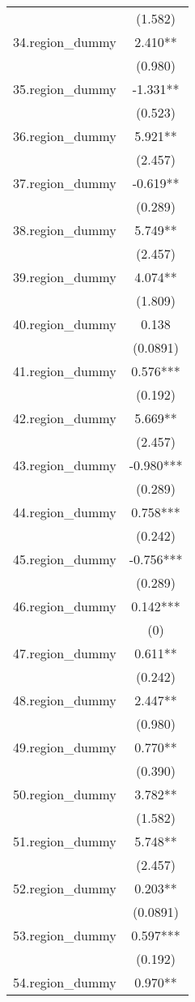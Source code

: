 \documentclass[]{article}
\begin{document}
\begin{tabular}{lc}
 & (1.582) \\
34.region\_dummy & 2.410** \\
 & (0.980) \\
35.region\_dummy & -1.331** \\
 & (0.523) \\
36.region\_dummy & 5.921** \\
 & (2.457) \\
37.region\_dummy & -0.619** \\
 & (0.289) \\
38.region\_dummy & 5.749** \\
 & (2.457) \\
39.region\_dummy & 4.074** \\
 & (1.809) \\
40.region\_dummy & 0.138 \\
 & (0.0891) \\
41.region\_dummy & 0.576*** \\
 & (0.192) \\
42.region\_dummy & 5.669** \\
 & (2.457) \\
43.region\_dummy & -0.980*** \\
 & (0.289) \\
44.region\_dummy & 0.758*** \\
 & (0.242) \\
45.region\_dummy & -0.756*** \\
 & (0.289) \\
46.region\_dummy & 0.142*** \\
 & (0) \\
47.region\_dummy & 0.611** \\
 & (0.242) \\
48.region\_dummy & 2.447** \\
 & (0.980) \\
49.region\_dummy & 0.770** \\
 & (0.390) \\
50.region\_dummy & 3.782** \\
 & (1.582) \\
51.region\_dummy & 5.748** \\
 & (2.457) \\
52.region\_dummy & 0.203** \\
 & (0.0891) \\
53.region\_dummy & 0.597*** \\
 & (0.192) \\
54.region\_dummy & 0.970** \\

\end{tabular}
\end{document}
